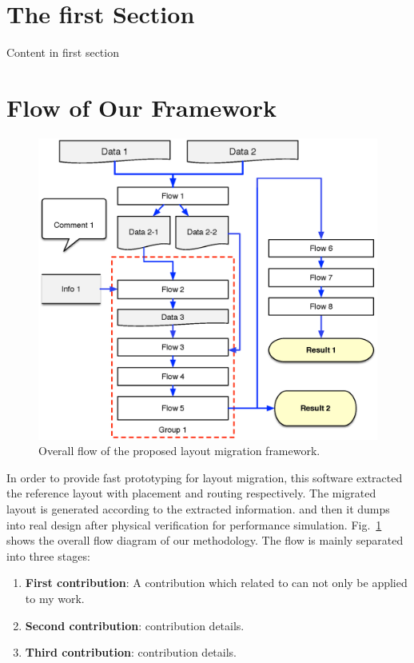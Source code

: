 
\section{The first Section}

  Content in first section \cite{Chin_DMR_ICCAD2013}

   

\section{Flow of Our Framework}
  \begin{figure}[ht]
    \centering
    \includegraphics[width=\linewidth]{Fig/proto_flow.eps}
    \caption{Overall flow of the proposed layout migration framework.} 
    \label{fig:Flow}
  \end{figure}


  In order to provide fast prototyping for layout migration, this software extracted the reference layout with placement and routing respectively. The migrated layout is generated according to the extracted information. and then it dumps into real design after physical verification for performance simulation. Fig.~\ref{fig:Flow} shows the overall flow diagram of our methodology.
  The flow is mainly separated into three stages: 
  \begin{enumerate}
    \item {\bf First contribution}: A contribution which related to \cite{Chin_DMR_ICCAD2013} can not only be applied to my work.
    \item {\bf Second contribution}: contribution details. 
    \item {\bf Third contribution}: contribution details.
  \end{enumerate}


